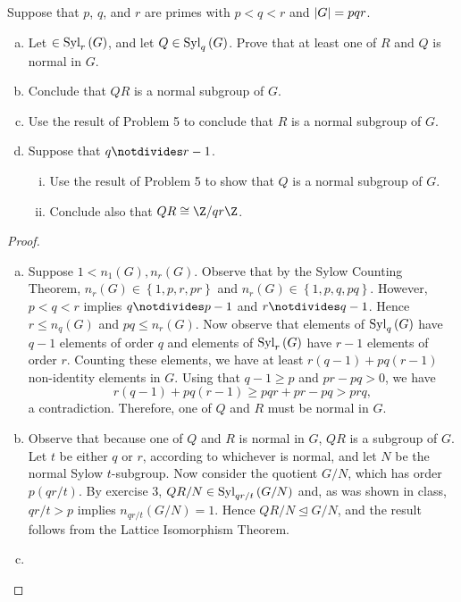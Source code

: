 \documentclass[10pt]{amsart}
\begin{document}
\begin{thm}
  Suppose that $p$, $q$, and $r$ are primes with $p < q < r$ and $\left| G \right| = pqr$.
  \begin{enumerate}[(a)]
    \item
      Let $\in \operatorname{Syl}_{r}\left(G\right)$, and let $Q \in \operatorname{Syl}_{q}\left(G\right)$.
      Prove that at least one of $R$ and $Q$ is normal in $G$.
    \item
      Conclude that $QR$ is a normal subgroup of $G$.
    \item
      Use the result of Problem 5 to conclude that $R$ is a normal subgroup of $G$.
    \item
      Suppose that $q \notdivides  r - 1$.
      \begin{enumerate}[(i)]
      \item
        Use the result of Problem 5 to show that $Q$ is a normal subgroup of $G$.
      \item
        Conclude also that $QR \cong \Z/qr\Z$.
      \end{enumerate}
  \end{enumerate}
  \begin{proof}
    \begin{enumerate}[(a)]
    \item
      Suppose $1 < n_1(G), n_r(G)$.
      Observe that by the Sylow Counting Theorem, $n_r(G) \in \left\{1, p, r, pr\right\}$ and $n_r(G) \in \left\{1, p, q, pq\right\}$.
      However, $p < q < r$ implies $q \notdivides p - 1$ and $r \notdivides q-1$.
      Hence $r \leq n_q(G)$ and $pq \leq n_r(G)$.
      Now observe that elements of $\operatorname{Syl}_{q}\left(G\right)$ have $q-1$ elements of order $q$ and elements of $\operatorname{Syl}_{r}\left(G\right)$ have $r - 1$ elements of order $r$.
      Counting these elements, we have at least $r(q-1) + pq(r-1)$ non-identity elements in $G$.
      Using that $q - 1 \geq p$ and $pr - pq > 0$, we have $$r(q-1) + pq(r-1) \geq pqr + pr - pq > prq,$$
      a contradiction.
      Therefore, one of $Q$ and $R$ must be normal in $G$.
    \item
      Observe that because one of $Q$ and $R$ is normal in $G$, $QR$ is a subgroup of $G$.
      Let $t$ be either $q$ or $r$, according to whichever is normal, and let $N$ be the normal Sylow $t$-subgroup. 
      Now consider the quotient $G/N$, which has order $p(qr / t)$.
      By exercise 3, $QR/N \in \operatorname{Syl}_{qr/t}\left(G/N\right)$ and, as was shown in class, $qr/t > p$ implies $n_{qr/t}(G/N) = 1$.
      Hence $QR/N \unlhd G/N$, and the result follows from the Lattice Isomorphism Theorem.
    \item

\end{enumerate}
\end{proof}
\end{thm}
\end{document}

